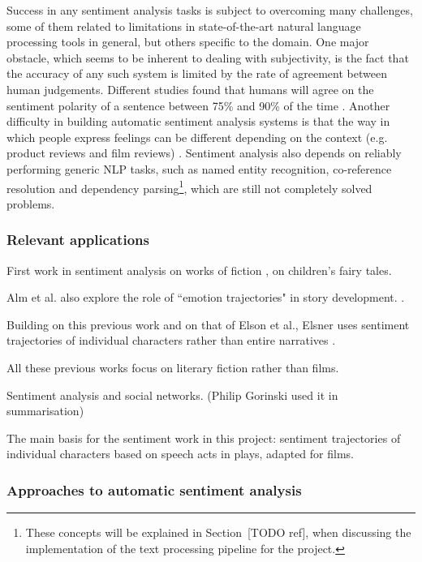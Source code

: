 \documentclass[bsc,frontabs,singlespacing,parskip, twoside]{infthesis}
\begin{document}
Success in any sentiment analysis tasks is subject to overcoming many challenges, some of them related to limitations in state-of-the-art natural language processing tools in general, but others specific to the domain. One major obstacle, which seems to be inherent to dealing with subjectivity, is the fact that the accuracy of any such system is limited by the rate of agreement between human judgements. Different studies found that humans will agree on the sentiment polarity of a sentence between 75\% and 90\% of the time \cite{godbole2007large, wilson2005recognizing}. Another difficulty in building automatic sentiment analysis systems is that the way in which people express feelings can be different depending on the context (e.g. product reviews and film reviews) \cite{varghesesurvey}. Sentiment analysis also depends on reliably performing generic NLP tasks, such as named entity recognition, co-reference resolution and dependency parsing\footnote{These concepts will be explained in Section~[TODO ref], when discussing the implementation of the text processing pipeline for the project.}, which are still not completely solved problems.

\subsubsection{Relevant applications}
First work in sentiment analysis on works of fiction \cite{alm2005emotions}, on children's fairy tales.

Alm et al. also explore the role of ``emotion trajectories" in story development. \cite{alm2005emotional}.

Building on this previous work and on that of Elson et al., Elsner uses sentiment trajectories of individual characters rather than entire narratives \cite{elsner2012character}.

All these previous works focus on literary fiction rather than films.

Sentiment analysis and social networks. (Philip Gorinski used it in summarisation)

The main basis for the sentiment work in this project: \cite{Nalisnick2013} sentiment trajectories of individual characters based on speech acts in plays, adapted for films.

\subsubsection{Approaches to automatic sentiment analysis}
\end{document}
